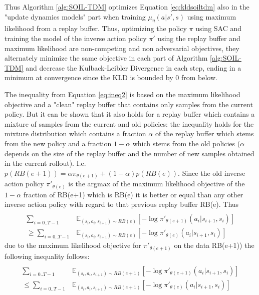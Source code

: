 \documentclass{article}
\begin{document}
Thus Algorithm \ref{alg:SOIL-TDM} optimizes Equation \ref{eq:kldsoiltdm} also in the "update dynamics models" part when training $\mu_{\eta}(a|s', s)$ using maximum likelihood from a replay buffer.
Thus, optimizing the policy $\pi$ using SAC and training the model of the inverse action policy $\pi'$ using the replay buffer and maximum likelihood are non-competing and non adversarial objectives, they alternately minimize the same objective in each part of Algorithm \ref{alg:SOIL-TDM} and decrease the Kulback-Leibler Divergence in each step, ending in a minimum at convergence since the KLD is bounded by $0$ from below.

The inequality from Equation \ref{eq:ineq2} is based on the maximum likelihood objective and a "clean" replay buffer that contains only samples from the current policy. But it can be shown that it also holds for a replay buffer which contains a mixture of samples from the current and old policies: the inequality holds for the mixture distribution which contains a fraction $\alpha$ of the replay buffer which stems from the new policy and a fraction $1-\alpha$ which stems from the old policies ($\alpha$ depends on the size of the replay buffer and the number of new samples obtained in the current rollout). I.e. $p(RB(e+1)) = \alpha \pi_{\theta (e+1)} + (1-\alpha)p(RB(e))$. Since the old inverse action policy $\pi'_{\theta(e)}$ is the argmax of the maximum likelihood objective of the $1-\alpha$ fraction of RB(e+1) which is RB(e) it is better or equal than any other inverse action policy with regard to that previous replay buffer RB(e). Thus
\begin{equation}\label{eq:ineq4}
\begin{aligned}
\\\sum_{i = 0..T-1} & \mathbb{E}_{(s_i,a_i,s_{i+1}) \sim {RB(e)}}[ - \log \pi'_{\theta(e+1)}(a_{i}|s_{i+1},s_i) ]
\\
\geq
\sum_{i = 0..T-1} & \mathbb{E}_{(s_i,a_i,s_{i+1}) \sim {RB(e)}}[ - \log \pi'_{\theta(e)}(a_{i}|s_{i+1},s_i) ]
\end{aligned}
\end{equation}
due to the maximum likelihood objective for $\pi'_{\theta(e+1)}$ on the data RB(e+1)) the following inequality follows:
\begin{equation}\label{eq:ineq5}
\begin{aligned}
\\\sum_{i = 0..T-1} & \mathbb{E}_{(s_i,a_i,s_{i+1}) \sim RB(e+1)}[ - \log \pi'_{\theta(e+1)}(a_{i}|s_{i+1},s_i) ]
\\
\leq
\sum_{i = 0..T-1} & \mathbb{E}_{(s_i,a_i,s_{i+1}) \sim RB(e+1)}[ - \log \pi'_{\theta(e)}(a_{i}|s_{i+1},s_i) ]
\end{aligned}
\end{equation}
\end{document}
